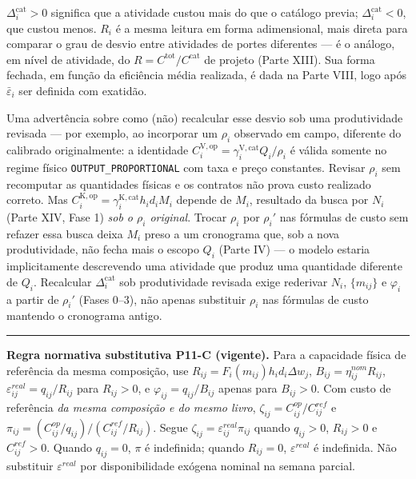 \documentclass[
  10pt,
]{article}
\begin{document}
\(\Delta_i^{\mathrm{cat}}>0\) significa que a atividade custou mais do
que o catálogo previa; \(\Delta_i^{\mathrm{cat}}<0\), que custou menos.
\(R_i\) é a mesma leitura em forma adimensional, mais direta para
comparar o grau de desvio entre atividades de portes diferentes --- é o
análogo, em nível de atividade, do
\(R=C^{\mathrm{tot}}/C^{\mathrm{cat}}\) de projeto (Parte XIII). Sua
forma fechada, em função da eficiência média realizada, é dada na Parte
VIII, logo após \(\bar\varepsilon_i\) ser definida com exatidão.

Uma advertência sobre como (não) recalcular esse desvio sob uma
produtividade revisada --- por exemplo, ao incorporar um \(\rho_i\)
observado em campo, diferente do calibrado originalmente: a identidade \(
C_i^{\mathrm{V,op}}=\gamma_i^{\mathrm{V,cat}}Q_i/\rho_i
\) é válida somente no regime físico \texttt{OUTPUT\_PROPORTIONAL} com taxa
e preço constantes. Revisar \(\rho_i\) sem recomputar as quantidades
físicas e os contratos não prova custo realizado correto. Mas \(C_i^{\mathrm{K,op}}=\gamma_i^{\mathrm{K,cat}}h_id_iM_i\)
depende de \(M_i\), resultado da busca por \(N_i\) (Parte XIV, Fase 1)
\emph{sob o \(\rho_i\) original}. Trocar \(\rho_i\) por \(\rho_i'\) nas
fórmulas de custo sem refazer essa busca deixa \(M_i\) preso a um
cronograma que, sob a nova produtividade, não fecha mais o escopo
\(Q_i\) (Parte IV) --- o modelo estaria implicitamente descrevendo uma
atividade que produz uma quantidade diferente de \(Q_i\). Recalcular
\(\Delta_i^{\mathrm{cat}}\) sob produtividade revisada exige rederivar
\(N_i\), \(\{m_{ij}\}\) e \(\varphi_i\) a partir de \(\rho_i'\) (Fases
0--3), não apenas substituir \(\rho_i\) nas fórmulas de custo mantendo o
cronograma antigo.

\begin{center}\rule{0.5\linewidth}{0.5pt}\end{center}

\noindent\textbf{Regra normativa substitutiva P11-C (vigente).}
Para a capacidade física de referência da mesma composição, use
\(R_{ij}=F_i(m_{ij})h_id_i\Delta w_j\),
\(B_{ij}=\eta_{ij}^{nom}R_{ij}\),
\(\varepsilon_{ij}^{real}=q_{ij}/R_{ij}\) para \(R_{ij}>0\), e
\(\varphi_{ij}=q_{ij}/B_{ij}\) apenas para \(B_{ij}>0\).
Com custo de referência \emph{da mesma composição e do mesmo livro},
\(\zeta_{ij}=C_{ij}^{op}/C_{ij}^{ref}\) e
\(\pi_{ij}=(C_{ij}^{op}/q_{ij})/(C_{ij}^{ref}/R_{ij})\).
Segue \(\zeta_{ij}=\varepsilon_{ij}^{real}\pi_{ij}\) quando
\(q_{ij}>0\), \(R_{ij}>0\) e \(C_{ij}^{ref}>0\).
Quando \(q_{ij}=0\), \(\pi\) é indefinida; quando \(R_{ij}=0\),
\(\varepsilon^{real}\) é indefinida. Não substituir
\(\varepsilon^{real}\) por disponibilidade exógena nominal na semana parcial.
\end{document}
